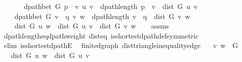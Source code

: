 \begin{isabellebody}
\ \ \isanewline
\ \ \ \ {\isachardoublequoteopen}dpath{\isacharunderscore}{\kern0pt}bet\ G\ {\isacharparenleft}{\kern0pt}p\ {\isacharat}{\kern0pt}\ {\isacharbrackleft}{\kern0pt}v{\isacharbrackright}{\kern0pt}{\isacharparenright}{\kern0pt}\ u\ v\ {\isasymand}\ dpath{\isacharunderscore}{\kern0pt}length\ {\isacharparenleft}{\kern0pt}p\ {\isacharat}{\kern0pt}\ {\isacharbrackleft}{\kern0pt}v{\isacharbrackright}{\kern0pt}{\isacharparenright}{\kern0pt}\ {\isacharequal}{\kern0pt}\ dist\ G\ u\ v{\isachardoublequoteclose}\isanewline
\ \ \ \ {\isachardoublequoteopen}dpath{\isacharunderscore}{\kern0pt}bet\ G\ {\isacharparenleft}{\kern0pt}v\ {\isacharhash}{\kern0pt}\ q{\isacharparenright}{\kern0pt}\ v\ w\ {\isasymand}\ dpath{\isacharunderscore}{\kern0pt}length\ {\isacharparenleft}{\kern0pt}v\ {\isacharhash}{\kern0pt}\ q{\isacharparenright}{\kern0pt}\ {\isacharequal}{\kern0pt}\ dist\ G\ v\ w{\isachardoublequoteclose}\isanewline
\ \ \ \ {\isachardoublequoteopen}dist\ G\ u\ w\ {\isacharequal}{\kern0pt}\ dist\ G\ u\ v\ {\isacharplus}{\kern0pt}\ dist\ G\ v\ w{\isachardoublequoteclose}\isanewline
%
\isadelimproof
\ \ %
\endisadelimproof
%
\isatagproof
{}\isamarkupfalse%
\ assms\isanewline
\ \ \isamarkupfalse%
\ dpath{\isacharunderscore}{\kern0pt}length{\isacharunderscore}{\kern0pt}eq{\isacharunderscore}{\kern0pt}dpath{\isacharunderscore}{\kern0pt}weight\ dist{\isacharunderscore}{\kern0pt}eq{\isacharunderscore}{\kern0pt}{\isasymdelta}\ is{\isacharunderscore}{\kern0pt}shortest{\isacharunderscore}{\kern0pt}dpath{\isacharunderscore}{\kern0pt}def{\isacharbrackleft}{\kern0pt}symmetric{\isacharbrackright}{\kern0pt}\isanewline
\ \ \isamarkupfalse%
\ {\isacharparenleft}{\kern0pt}elim\ is{\isacharunderscore}{\kern0pt}shortest{\isacharunderscore}{\kern0pt}dpathE{\isacharparenright}{\kern0pt}%
\endisatagproof
{\isafoldproof}%
%
\isadelimproof
\isanewline
%
\endisadelimproof
\isanewline
{}\isamarkupfalse%
\ {\isacharparenleft}{\kern0pt}\ finite{\isacharunderscore}{\kern0pt}dgraph{\isacharparenright}{\kern0pt}\ dist{\isacharunderscore}{\kern0pt}triangle{\isacharunderscore}{\kern0pt}inequality{\isacharunderscore}{\kern0pt}edge{\isacharcolon}{\kern0pt}\isanewline
\ \ \ {\isachardoublequoteopen}{\isacharparenleft}{\kern0pt}v{\isacharcomma}{\kern0pt}\ w{\isacharparenright}{\kern0pt}\ {\isasymin}\ G{\isachardoublequoteclose}\isanewline
\ \ \ {\isachardoublequoteopen}dist\ G\ u\ w\ {\isasymle}\ dist\ G\ u\ v\ {\isacharplus}{\kern0pt}\ {}{\isachardoublequoteclose}\isanewline

\end{isabellebody}
